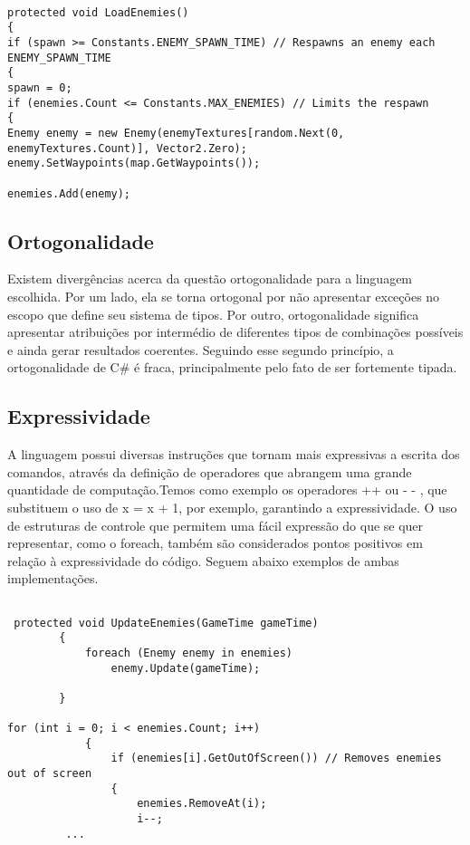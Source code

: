 \documentclass[rel_mlp]{iiufrgs}
\begin{document}
\begin{lstlisting}[caption=Trecho de código C\# retirado da implementação deste trabalho, label=lst:test]

protected void LoadEnemies()
{
if (spawn >= Constants.ENEMY_SPAWN_TIME) // Respawns an enemy each ENEMY_SPAWN_TIME
{
spawn = 0;
if (enemies.Count <= Constants.MAX_ENEMIES) // Limits the respawn
{
Enemy enemy = new Enemy(enemyTextures[random.Next(0, enemyTextures.Count)], Vector2.Zero);
enemy.SetWaypoints(map.GetWaypoints());

enemies.Add(enemy);

\end{lstlisting}

\subsection{Ortogonalidade}

Existem divergências acerca da questão ortogonalidade para a linguagem escolhida. Por um lado, ela se torna ortogonal por não apresentar exceções no escopo que define seu sistema de tipos. Por outro, ortogonalidade significa apresentar atribuições por intermédio de diferentes tipos de combinações possíveis e ainda gerar resultados coerentes. Seguindo esse segundo princípio, a ortogonalidade de C# é fraca, principalmente pelo fato de ser fortemente tipada. 

\subsection{Expressividade}

A linguagem possui diversas instruções que tornam mais expressivas a escrita dos comandos, através da definição de operadores que abrangem uma grande quantidade de computação.Temos como exemplo os operadores ++ ou - - , que substituem o uso de x = x + 1, por exemplo, garantindo a expressividade. O uso de estruturas de controle que permitem uma fácil expressão do que se quer representar, como o foreach, também são considerados pontos positivos em relação à expressividade do código. Seguem abaixo exemplos de ambas implementações.

\begin{lstlisting}[caption=Trecho de código C\# retirado da implementação deste trabalho, label=lst:test]

 protected void UpdateEnemies(GameTime gameTime)
        {
            foreach (Enemy enemy in enemies)
                enemy.Update(gameTime);

        }

for (int i = 0; i < enemies.Count; i++)
            {
                if (enemies[i].GetOutOfScreen()) // Removes enemies out of screen
                {
                    enemies.RemoveAt(i);
                    i--;
	     ...

\end{lstlisting}
\end{document}
